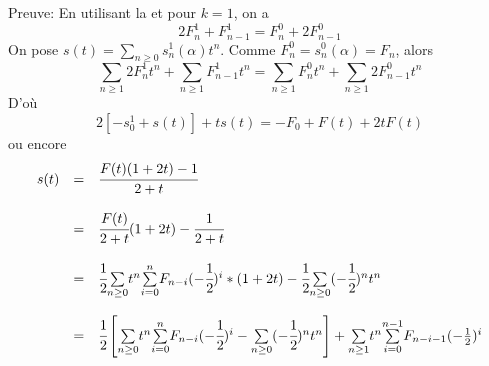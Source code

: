 Preuve:
En utilisant la  et pour $k=1$, on a\[ 2F_{n}^{1}+F_{n-1}^{1}=F_{n}^{0}+2F_{n-1}^{0} \]
On pose $s(t)=\underset{n\geq 0}{\sum}s_{n}^{1}(\alpha)t^{n}$. Comme $F_{n}^{0} = s_{n}^{0}(\alpha)=F_{n}$, alors
\[
	\underset{n\geq 1}{\sum}2F_{n}^{1}t^n + \underset{n\geq 1}{\sum}F_{n-1}^{1}t^n = \underset{n\geq 1}{\sum}F_{n}^{0}t^n + \underset{n\geq 1}{\sum}2F_{n-1}^{0}t^n
\]
D'où
\[2[-s_{0}^{1}+s(t)]+ts(t)=-F_{0}+F(t)+2tF(t) \]ou encore
\[
	\begin{array}{l l l}
		s(t) & =       & \cfrac{F(t)(1+2t)-1}{2+t}                                                                                                                                                                                                                                      \\
		     & \text{} &                                                                                                                                                                                                                                                                \\
		     & =       & \cfrac{F(t)}{2+t}(1+2t)-\cfrac{1}{2+t}                                                                                                                                                                                                                         \\
		     & \text{} &                                                                                                                                                                                                                                                                \\
		     & =       & \cfrac{1}{2}\underset{n\geq 0}{\sum}t^{n}\underset{i=0}{\overset{n}{\sum}}F_{n-i}(-\cfrac{1}{2})^{i}*(1+2t)-\cfrac{1}{2}\underset{n\geq 0}{\sum}(-\cfrac{1}{2})^{n}t^{n}                                                                                       \\
		     & \text{} &                                                                                                                                                                                                                                                                \\
		     & =       & \cfrac{1}{2}\left[\underset{n\geq 0}{\sum}t^{n}\underset{i=0}{\overset{n}{\sum}}F_{n-i}(-\cfrac{1}{2})^{i}-\underset{n\geq 0}{\sum}(-\cfrac{1}{2})^{n}t^{n}\right]+\underset{n\geq 1}{\sum}t^{n}\underset{i=0}{\overset{n-1}{\sum}}F_{n-i-1}(-\frac{1}{2})^{i}
	\end{array}
\]
